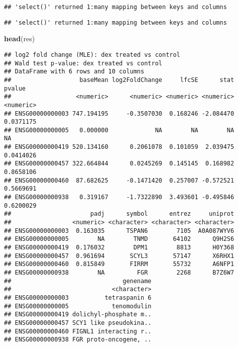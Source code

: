 \documentclass[
]{article}
\newenvironment{Shaded}{\begin{snugshade}}{\end{snugshade}}
\newcommand{\AttributeTok}[1]{\textcolor[rgb]{0.13,0.29,0.53}{#1}}
\newcommand{\FunctionTok}[1]{\textcolor[rgb]{0.13,0.29,0.53}{\textbf{#1}}}
\newcommand{\NormalTok}[1]{#1}
\newcommand{\OtherTok}[1]{\textcolor[rgb]{0.56,0.35,0.01}{#1}}
\newcommand{\SpecialCharTok}[1]{\textcolor[rgb]{0.81,0.36,0.00}{\textbf{#1}}}
\newcommand{\StringTok}[1]{\textcolor[rgb]{0.31,0.60,0.02}{#1}}
\begin{document}
\begin{verbatim}
## 'select()' returned 1:many mapping between keys and columns
\end{verbatim}

\begin{Shaded}
\end{Shaded}

\begin{verbatim}
## 'select()' returned 1:many mapping between keys and columns
\end{verbatim}

\begin{Shaded}
\begin{Highlighting}[]
\FunctionTok{head}\NormalTok{(res)}
\end{Highlighting}
\end{Shaded}

\begin{verbatim}
## log2 fold change (MLE): dex treated vs control 
## Wald test p-value: dex treated vs control 
## DataFrame with 6 rows and 10 columns
##                   baseMean log2FoldChange     lfcSE      stat    pvalue
##                  <numeric>      <numeric> <numeric> <numeric> <numeric>
## ENSG00000000003 747.194195     -0.3507030  0.168246 -2.084470 0.0371175
## ENSG00000000005   0.000000             NA        NA        NA        NA
## ENSG00000000419 520.134160      0.2061078  0.101059  2.039475 0.0414026
## ENSG00000000457 322.664844      0.0245269  0.145145  0.168982 0.8658106
## ENSG00000000460  87.682625     -0.1471420  0.257007 -0.572521 0.5669691
## ENSG00000000938   0.319167     -1.7322890  3.493601 -0.495846 0.6200029
##                      padj      symbol      entrez     uniprot
##                 <numeric> <character> <character> <character>
## ENSG00000000003  0.163035      TSPAN6        7105  A0A087WYV6
## ENSG00000000005        NA        TNMD       64102      Q9H2S6
## ENSG00000000419  0.176032        DPM1        8813      H0Y368
## ENSG00000000457  0.961694       SCYL3       57147      X6RHX1
## ENSG00000000460  0.815849       FIRRM       55732      A6NFP1
## ENSG00000000938        NA         FGR        2268      B7Z6W7
##                               genename
##                            <character>
## ENSG00000000003          tetraspanin 6
## ENSG00000000005            tenomodulin
## ENSG00000000419 dolichyl-phosphate m..
## ENSG00000000457 SCY1 like pseudokina..
## ENSG00000000460 FIGNL1 interacting r..
## ENSG00000000938 FGR proto-oncogene, ..
\end{verbatim}
\end{document}
